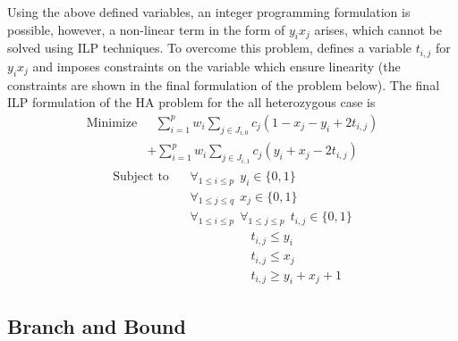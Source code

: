 \documentclass[10pt,twocolumn]{article}
\begin{document}
Using the above defined variables, an integer programming formulation is possible, however, a non-linear 
term in the form of $y_ix_j$ arises, which cannot be solved using ILP techniques. To overcome this problem, 
\cite{chen:2013} defines a variable $t_{i,j}$ for $y_ix_j$ and imposes constraints on the variable which 
ensure linearity (the constraints are shown in the final formulation of the problem below). The final ILP 
formulation of the HA problem for the all heterozygous case is 
\begin{equation*}
\begin{split}
    \textrm{Minimize} 
    &\ \ \ \sum_{i = 1}^{p}{w_i} \sum_{j \in J_{i, 0} }^{}{c_j(1 - x_j - y_i + 2t_{i,j})}                 \\
    &+ \sum_{i = 1}^{p}{w_i} \sum_{j \in J_{i, 1}}^{}{c_j(y_i + x_j - 2t_{i,j})}                
\end{split}
\end{equation*}
\begin{equation*}
\begin{split}
    \textrm{Subject to} 
    &\ \ \ \ \forall_{1 \le i \le p} \ \ y_i \in \{0, 1\}                                                 \\
    &\ \ \ \ \forall_{1 \le j \le q} \ \ x_j \in \{0, 1\}                                                 \\
    &\ \ \ \ \forall_{1 \le i \le p} \ \ \forall_{1 \le j \le p} \ \ t_{i,j} \in \{0, 1\}                 \\
    &\ \ \ \ \ \ \ \ \ \ \ \ \ \ \ \ \ \ \ \ \ \ \ \ \ \ t_{i,j} \le y_i                                  \\ 
    &\ \ \ \ \ \ \ \ \ \ \ \ \ \ \ \ \ \ \ \ \ \ \ \ \ \ t_{i,j} \le x_j                                  \\ 
    &\ \ \ \ \ \ \ \ \ \ \ \ \ \ \ \ \ \ \ \ \ \ \ \ \ \ t_{i,j} \ge y_i + x_j + 1              
    \end{split}
\end{equation*}


\subsection{Branch and Bound} \label{sec:bnb}
\end{document}
